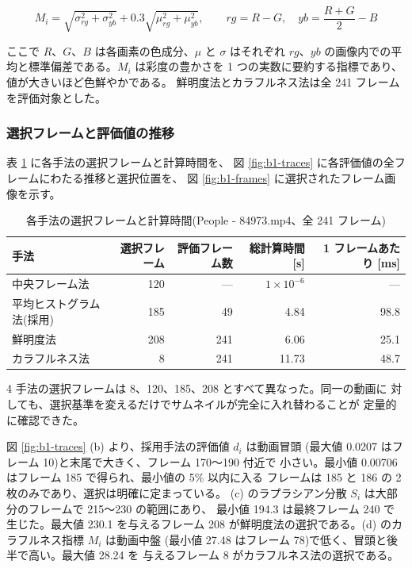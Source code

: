\begin{equation}\label{eq:b1-colorfulness}
M_i = \sqrt{\sigma_{rg}^2 + \sigma_{yb}^2}
      + 0.3 \sqrt{\mu_{rg}^2 + \mu_{yb}^2} , \qquad
rg = R - G , \quad yb = \frac{R + G}{2} - B
\end{equation}

ここで $R$、$G$、$B$ は各画素の色成分、$\mu$ と $\sigma$ はそれぞれ
$rg$、$yb$ の画像内での平均と標準偏差である。$M_i$ は彩度の豊かさを
1 つの実数に要約する指標であり、値が大きいほど色鮮やかである。
鮮明度法とカラフルネス法は全 241 フレームを評価対象とした。

\subsubsection{選択フレームと評価値の推移}

表 \ref{tab:b1-selected} に各手法の選択フレームと計算時間を、
図 \ref{fig:b1-traces} に各評価値の全フレームにわたる推移と選択位置を、
図 \ref{fig:b1-frames} に選択されたフレーム画像を示す。

\begin{table}[htbp]
\centering
\caption{各手法の選択フレームと計算時間(People - 84973.mp4、全 241 フレーム)}
\label{tab:b1-selected}
{\small
\begin{tabular}{lrrrr}
\hline
手法 & 選択フレーム & 評価フレーム数 & 総計算時間 [s] & 1 フレームあたり [ms] \\
\hline
中央フレーム法 & 120 & --- & $1 \times 10^{-6}$ & --- \\
平均ヒストグラム法(採用) & 185 & 49 & 4.84 & 98.8 \\
鮮明度法 & 208 & 241 & 6.06 & 25.1 \\
カラフルネス法 & 8 & 241 & 11.73 & 48.7 \\
\hline
\end{tabular}
}
\end{table}

4 手法の選択フレームは 8、120、185、208 とすべて異なった。同一の動画に
対しても、選択基準を変えるだけでサムネイルが完全に入れ替わることが
定量的に確認できた。

図 \ref{fig:b1-traces} (b) より、採用手法の評価値 $d_i$ は動画冒頭
(最大値 0.0207 はフレーム 10)と末尾で大きく、フレーム 170〜190 付近で
小さい。最小値 0.00706 はフレーム 185 で得られ、最小値の 5\% 以内に入る
フレームは 185 と 186 の 2 枚のみであり、選択は明確に定まっている。
(c) のラプラシアン分散 $S_i$ は大部分のフレームで 215〜230 の範囲にあり、
最小値 194.3 は最終フレーム 240 で生じた。最大値 230.1 を与えるフレーム 208
が鮮明度法の選択である。(d) のカラフルネス指標 $M_i$ は動画中盤
(最小値 27.48 はフレーム 78)で低く、冒頭と後半で高い。最大値 28.24 を
与えるフレーム 8 がカラフルネス法の選択である。

